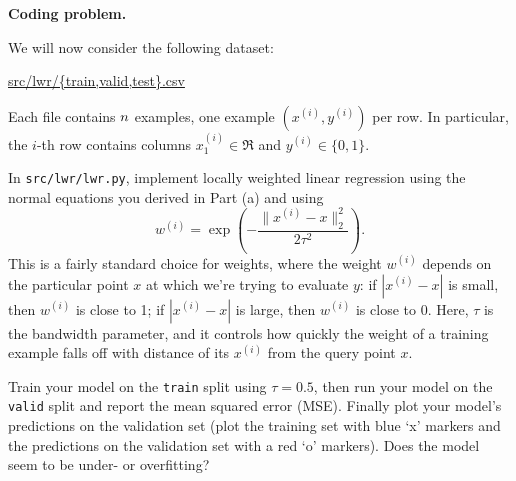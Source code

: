 \item {} \textbf{Coding problem.}

We will now consider the following dataset:
\begin{center}
	\url{src/lwr/{train,valid,test}.csv}	
\end{center}

Each file contains ${n}$ examples, one example $(x^{(i)}, y^{(i)})$ per row.
In particular, the $i$-th row contains columns $x^{(i)}_1\in\Re$ and $y^{(i)}\in\{0, 1\}$.

In \texttt{src/lwr/lwr.py}, implement locally weighted linear regression
using the normal equations you derived in Part (a) and using
%
\begin{equation*}
	w^{(i)} = \exp\left(-\frac{\|x^{(i)} - x\|_2^2}{2\tau^2}\right).
\end{equation*}
%
This is a fairly standard choice for weights, where the weight $w^{(i)}$ depends on the particular point $x$ at which we’re trying to evaluate $y$: if $|x^{(i)}-x|$ is small, then $w^{(i)}$ is close to 1; if $|x^{(i)}-x|$ is large, then $w^{(i)}$ is close to 0. Here, $\tau$ is the bandwidth parameter, and it controls how quickly the weight of a training example falls off with distance of its $x^{(i)}$ from the query point $x$.

Train your model on the \texttt{train} split using $\tau = 0.5$, then run your
model on the \texttt{valid} split and report the mean squared error (MSE).
Finally plot your model's predictions on the validation set (plot the
training set with blue `x' markers and the predictions on the
validation set with a red `o' markers). Does the model seem to be under-
or overfitting?
